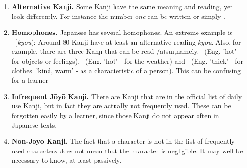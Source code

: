 \begin{enumerate}
  \item \textbf{Alternative Kanji.} Some Kanji have the same meaning and reading,
        yet look differently. For instance the number \emph{one} can be written
         or simply .

  \item \textbf{Homophones.} Japanese has several homophones. An extreme example
        is ~(\emph{kyou}): Around 80 Kanji have at least an 
        alternative reading \emph{kyou}. 
        Also, for example, there are three Kanji 
        that can be read /atsui,namely, 
        ~(Eng. 'hot' - for objects or feelings), 
        ~(Eng. 'hot' - for the weather) and 
        ~(Eng. 'thick' - for clothes; 'kind, warm' - as a 
        characteristic of a person). This can be confusing for a learner.

  \item \textbf{Infrequent Jōyō Kanji.} There are Kanji that are in the official
        list of daily use Kanji, but in fact they are actually not frequently 
        used. These can be forgotten easily by a learner, since those Kanji do 
        not appear often in Japanese texts.

  \item \textbf{Non-Jōyō Kanji.} The fact that a character is not in the list 
        of frequently used characters does not mean that the character is 
        negligible. It may well be necessary to know, at least passively.
\end{enumerate}


